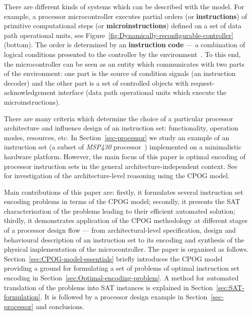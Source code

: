 There are different kinds of systems which can be described with the
model. For example, a processor microcontroller executes partial orders
(or \textbf{instructions}) of primitive computational steps (or \textbf{microinstructions})
defined on a set of data path operational units, see Figure~\ref{fig:Dynamically-reconfigurable-controller}
(bottom). The order is determined by an \textbf{instruction}\textbf{\emph{
}}\textbf{code} --- a combination of logical conditions presented
to the controller by the environment~\cite{1994_de_micheli_book}.
To this end, the microcontroller can be seen as an entity which communicates
with two parts of the environment: one part is the source of condition
signals (an instruction decoder) and the other part is a set of controlled
objects with request-acknowledgement interface (data path operational
units which execute the microinstructions).

There are many criteria which determine the choice of a particular
processor architecture and influence design of an instruction set:
functionality, operation modes, resources, etc. In Section~\ref{sec-processor}
we study an example of an instruction set (a subset of \emph{MSP430}
processor~\cite{mspmanual}) implemented on a minimalistic hardware
platform. However, the main focus of this paper is optimal encoding
of processor instruction sets in the general architecture-independent
context. See~\cite{2011_mokhov_tr} for investigation of the architecture-level
reasoning using the CPOG model.

Main contributions of this paper are: firstly, it formulates several
instruction set encoding problems in terms of the CPOG model; secondly,
it presents the SAT characterisation of the problems leading to their
efficient automated solution; thirdly, it demonstrates application
of the CPOG methodology at different stages of a processor design
flow --- from architectural-level specification, design and behavioural
description of an instruction set to its encoding and synthesis of
the physical implementation of the microcontroller. The paper is organised
as follows. Section~\ref{sec:CPOG-model-essentials} briefly introduces
the CPOG model providing a ground for formulating a set of problems
of optimal instruction set encoding in Section~\ref{sec:Optimal-encoding-problem}.
A method for automated translation of the problems into SAT instances
is explained in Section~\ref{sec:SAT-formulation}. It is followed
by a processor design example in Section~\ref{sec-processor} and
conclusions.
